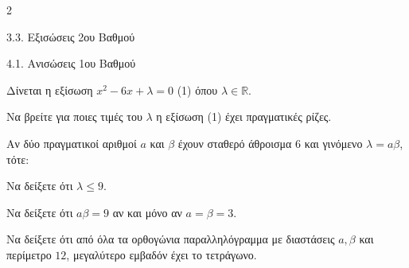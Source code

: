 \begin{ylh}{2}
    \item 3.3. Εξισώσεις 2ου Βαθμού
    \item 4.1. Ανισώσεις 1ου Βαθμού
\end{ylh}
Δίνεται η εξίσωση $x^2 - 6x + \lambda = 0$ (1) όπου $\lambda \in \mathbb{R}$.
\begin{alist}
\item Να βρείτε για ποιες τιμές του $\lambda$ η εξίσωση (1) έχει πραγματικές ρίζες.
\item Αν δύο πραγματικοί αριθμοί $a$ και $\beta$ έχουν σταθερό άθροισμα 6 και γινόμενο $\lambda = a\beta$, τότε:
\begin{rlist}
\item Να δείξετε ότι $\lambda \le 9$.
\item Να δείξετε ότι $a\beta = 9$ αν και μόνο αν $a = \beta = 3$.
\end{rlist}
\item Να δείξετε ότι από όλα τα ορθογώνια παραλληλόγραμμα με διαστάσεις $a, \beta$ και περίμετρο $12$, μεγαλύτερο εμβαδόν έχει το τετράγωνο.

\end{alist}

